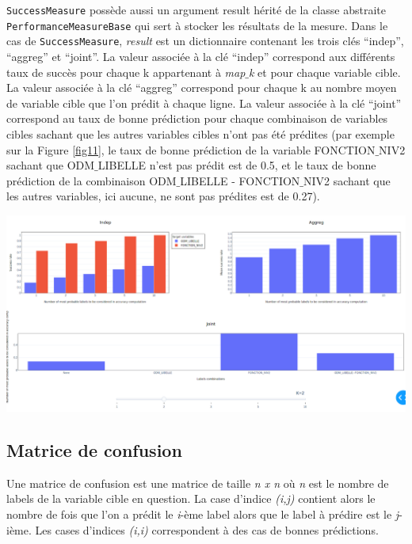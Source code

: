 \texttt{SuccessMeasure} possède aussi un argument result hérité de la classe abstraite \texttt{PerformanceMeasureBase} qui sert à stocker les résultats de la mesure. Dans le cas de \texttt{SuccessMeasure}, \textit{result} est un dictionnaire contenant les trois clés “indep”, “aggreg” et “joint”.
La valeur associée à la clé “indep” correspond aux différents taux de succès pour chaque k appartenant à \textit{map$\_$k} et pour chaque variable cible.
La valeur associée à la clé “aggreg” correspond pour chaque k au nombre moyen de variable cible que l’on prédit à chaque ligne.
La valeur associée à la clé “joint” correspond au taux de bonne prédiction pour chaque combinaison de variables cibles sachant que les autres variables cibles n’ont pas été prédites (par exemple sur la Figure \ref{fig11}, le taux de bonne prédiction de la variable FONCTION$\_$NIV2 sachant que ODM$\_$LIBELLE n’est pas prédit est de 0.5, et le taux de bonne prédiction de la combinaison ODM$\_$LIBELLE - FONCTION$\_$NIV2 sachant que les autres variables, ici aucune, ne sont pas prédites est de 0.27).

\begin{center}
\includegraphics[scale=0.25]{figures/visu_success.png}
\label{fig11}
\end{center}

\subsection{Matrice de confusion}

Une matrice de confusion est une matrice de taille \textit{n x n} où \textit{n} est le nombre de labels de la variable cible en question. La case d’indice \textit{(i,j)} contient alors le nombre de fois que l’on a prédit le \textit{i}-ème label alors que le label à prédire est le \textit{j}-ième. Les cases d’indices \textit{(i,i)} correspondent à des cas de bonnes prédictions.

